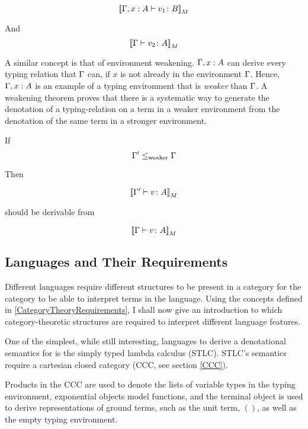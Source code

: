 \documentclass{Report}
\begin{document}
\begin{equation}
    {\bf [\![}\Gamma, x: A \vdash v_1 \colon B{\bf ]\!]}_M
\end{equation}

And  \begin{equation}
    {\bf [\![}\Gamma \vdash v_2 \colon A{\bf ]\!]}_M
\end{equation}

A similar concept is that of environment weakening. $\Gamma, x: A$ can derive every typing relation that $\Gamma$ can, if $x$ is not already in the environment $\Gamma$. Hence, $\Gamma, x: A$ is an example of a typing environment that is \textit{weaker} than $\Gamma$. A weakening theorem proves that there is a systematic way to generate the denotation of a typing-relation on a term in a weaker environment from the denotation of the same term in a stronger environment.

If \begin{equation}
    \Gamma' \leq_{\text{weaker}} \Gamma
\end{equation}

Then

\begin{equation}
    {\bf [\![}\Gamma' \vdash v \colon A{\bf ]\!]}_M
\end{equation}

should be derivable from

\begin{equation}
    {\bf [\![}\Gamma \vdash v \colon A{\bf ]\!]}_M
\end{equation}

\subsection{Languages and Their Requirements}
Different languages require different structures to be present in a category for the category to be able to interpret terms in the language. Using the concepts defined in \ref{CategoryTheoryRequirements}, I shall now give an introduction to which category-theoretic structures are required to interpret different language features. 

One of the simplest, while still interesting, languages to derive a denotational semantics for is the simply typed lambda calculus (STLC). STLC's semantics require a cartesian closed category (CCC, see section \ref{CCC}).

Products in the CCC are used to denote the lists of variable types in the typing environment, exponential objects model functions, and the terminal object is used to derive representations of ground terms, such as the unit term, $()$, as well as the empty typing environment.
\end{document}
